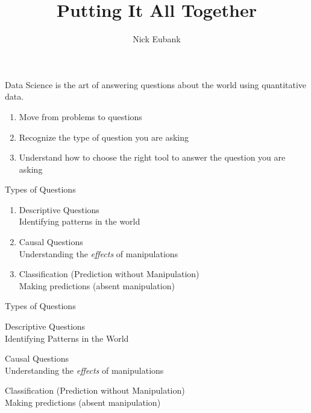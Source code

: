 \documentclass[11pt]{beamer}
\title{Putting It All Together}
\author{\small Nick Eubank}
\date{\vspace*{.3in} \date}
\begin{document}
\begin{frame}[c]
\maketitle
\end{frame}

\begin{frame}[c]{}
  \pause Data Science is the art of \alert{answering questions} about the world using \alert{quantitative data.} 
\end{frame}

\begin{frame}[c]{}
 \begin{enumerate}
   \pause \item Move from \alert{problems to questions}
   \pause \item Recognize the \alert{type} of question you are asking 
   \pause \item Understand how to choose the \alert{right tool} to answer the question you are asking
 \end{enumerate}
\end{frame}

\begin{frame}[c]{Types of Questions}
  \begin{enumerate}
    \pause \item Descriptive Questions \\
    {\color{gray} Identifying patterns in the world}
    \pause \item Causal Questions \\
    {\color{gray} Understanding the \emph{effects} of manipulations}
    \pause \item Classification (Prediction without Manipulation) \\
    {\color{gray} Making predictions (absent manipulation)}
  \end{enumerate}
\end{frame}


\begin{frame}[c]{Types of Questions}
  \begin{enumerate}
    \item \alert{Descriptive Questions} \\
    {\color{gray} Identifying Patterns in the World}
    {\color{gray} \item Causal Questions \\
    {\color{gray} Understanding the \emph{effects} of manipulations}
    \item Classification (Prediction without Manipulation) \\
    {\color{gray} Making predictions (absent manipulation)} }
  \end{enumerate}
\end{frame}
\end{document}
